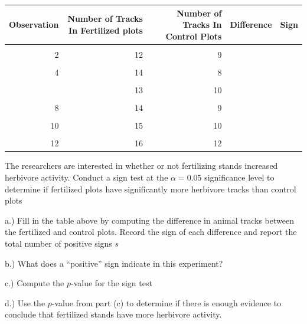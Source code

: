 \documentclass[
]{article}
\begin{document}
\begin{table}[H]
\centering\centering
\begin{tabular}{rrrll}
\toprule
Observation & Number of Tracks In Fertilized plots & Number of Tracks In Control Plots & Difference & Sign\\
\midrule
\cellcolor{gray!10}{1} & \cellcolor{gray!10}{15} & \cellcolor{gray!10}{10} & \cellcolor{gray!10}{} & \cellcolor{gray!10}{}\\
2 & 12 & 9 &  & \\
\cellcolor{gray!10}{3} & \cellcolor{gray!10}{18} & \cellcolor{gray!10}{11} & \cellcolor{gray!10}{} & \cellcolor{gray!10}{}\\
4 & 14 & 8 &  & \\
\cellcolor{gray!10}{5} & \cellcolor{gray!10}{16} & \cellcolor{gray!10}{12} & \cellcolor{gray!10}{} & \cellcolor{gray!10}{}\\
\addlinespace
6 & 13 & 10 &  & \\
\cellcolor{gray!10}{7} & \cellcolor{gray!10}{17} & \cellcolor{gray!10}{11} & \cellcolor{gray!10}{} & \cellcolor{gray!10}{}\\
8 & 14 & 9 &  & \\
\cellcolor{gray!10}{9} & \cellcolor{gray!10}{19} & \cellcolor{gray!10}{13} & \cellcolor{gray!10}{} & \cellcolor{gray!10}{}\\
10 & 15 & 10 &  & \\
\addlinespace
\cellcolor{gray!10}{11} & \cellcolor{gray!10}{11} & \cellcolor{gray!10}{8} & \cellcolor{gray!10}{} & \cellcolor{gray!10}{}\\
12 & 16 & 12 &  & \\
\bottomrule
\end{tabular}
\end{table}

The researchers are interested in whether or not fertilizing stands
increased herbivore activity. Conduct a sign test at the
\(\alpha = 0.05\) significance level to determine if fertilized plots
have significantly more herbivore tracks than control plots

a.) Fill in the table above by computing the difference in animal tracks
between the fertilized and control plots. Record the sign of each
difference and report the total number of positive signs \(s\)

b.) What does a ``positive'' sign indicate in this experiment?

c.) Compute the \(p\)-value for the sign test

d.) Use the \(p\)-value from part (c) to determine if there is enough
evidence to conclude that fertilized stands have more herbivore
activity.
\end{document}
